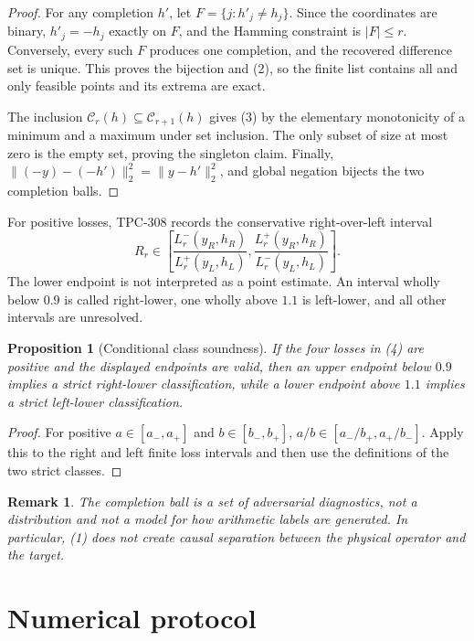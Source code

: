 \documentclass[11pt]{article}
\newtheorem{proposition}{Proposition}
\newtheorem{remark}{Remark}
\begin{document}
\begin{proof}
For any completion $h'$, let
$F=\{j:h'_j\ne h_j\}$.  Since the coordinates are binary, $h'_j=-h_j$
exactly on $F$, and the Hamming constraint is $|F|\le r$.  Conversely,
every such $F$ produces one completion, and the recovered difference set is
unique.  This proves the bijection and (2), so the finite list contains all
and only feasible points and its extrema are exact.

The inclusion $\mathcal C_r(h)\subseteq\mathcal C_{r+1}(h)$ gives (3) by
the elementary monotonicity of a minimum and a maximum under set inclusion.
The only subset of size at most zero is the empty set, proving the singleton
claim.  Finally,
$\|(-y)-(-h')\|_2^2=\|y-h'\|_2^2$, and global negation bijects the two
completion balls.
\end{proof}

For positive losses, TPC-308 records the conservative right-over-left
interval
\[
 R_r\in\left[
 \frac{L_r^-(y_R,h_R)}{L_r^+(y_L,h_L)},
 \frac{L_r^+(y_R,h_R)}{L_r^-(y_L,h_L)}\right].                  \tag{4}
\]
The lower endpoint is not interpreted as a point estimate.  An interval
wholly below $0.9$ is called right-lower, one wholly above $1.1$ is
left-lower, and all other intervals are unresolved.

\begin{proposition}[Conditional class soundness]
If the four losses in (4) are positive and the displayed endpoints are
valid, then an upper endpoint below $0.9$ implies a strict right-lower
classification, while a lower endpoint above $1.1$ implies a strict
left-lower classification.
\end{proposition}

\begin{proof}
For positive $a\in[a_-,a_+]$ and $b\in[b_-,b_+]$,
$a/b\in[a_-/b_+,a_+/b_-]$.  Apply this to the right and left finite loss
intervals and then use the definitions of the two strict classes.
\end{proof}

\begin{remark}
The completion ball is a set of adversarial diagnostics, not a distribution
and not a model for how arithmetic labels are generated.  In particular,
(1) does not create causal separation between the physical operator and the
target.
\end{remark}

\section{Numerical protocol}
\end{document}
